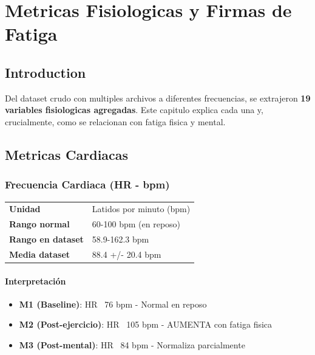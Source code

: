 \chapter{Metricas Fisiologicas y Firmas de Fatiga}
\label{cap:metrics}

\section{Introduction}

Del dataset crudo con multiples archivos a diferentes frecuencias, se extrajeron
\textbf{19 variables fisiologicas agregadas}. Este capitulo explica cada una y,
crucialmente, como se relacionan con fatiga fisica y mental.

\section{Metricas Cardiacas}

\subsection{Frecuencia Cardiaca (HR - bpm)}

\begin{small}
\begin{table}[H]
\centering
\begin{tabular}{|l|p{10cm}|}
\hline
\textbf{Unidad} & Latidos por minuto (bpm) \\
\textbf{Rango normal} & 60-100 bpm (en reposo) \\
\textbf{Rango en dataset} & 58.9-162.3 bpm \\
\textbf{Media dataset} & 88.4 +/- 20.4 bpm \\
\hline
\end{tabular}
\end{table}
\end{small}

\subsubsection{Interpretación}

\begin{itemize}
    \item \textbf{M1 (Baseline)}: HR ~76 bpm - Normal en reposo
    \item \textbf{M2 (Post-ejercicio)}: HR ~105 bpm - AUMENTA con fatiga fisica
    \item \textbf{M3 (Post-mental)}: HR ~84 bpm - Normaliza parcialmente
\end{itemize}

